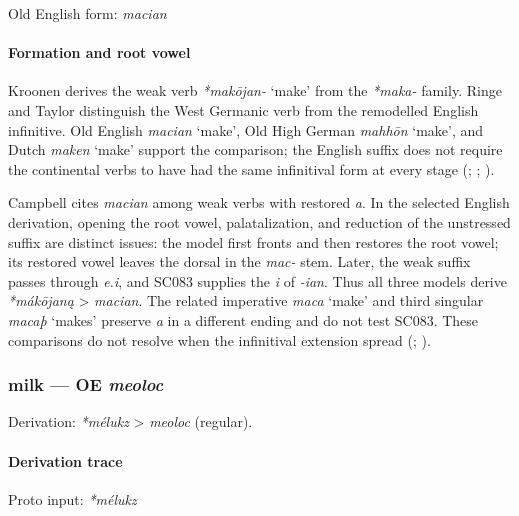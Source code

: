 \documentclass[
  british,
  a4paper,
]{article}
\providecommand{\Recon}[1]{\emph{*#1}}
\begin{document}
Old English form: \emph{macian}

\paragraph{Formation and root vowel}\label{formation-and-root-vowel}

Kroonen derives the weak verb \Recon{makōjan-} `make' from the
\emph{*maka-} family. Ringe and Taylor distinguish the West Germanic
verb from the remodelled English infinitive. Old English {\emph{macian}}
`make', Old High German \emph{mahhōn} `make', and Dutch \emph{maken}
`make' support the comparison; the English suffix does not require the
continental verbs to have had the same infinitival form at every stage
(;
;
).

Campbell cites \emph{macian} among weak verbs with restored \emph{a}. In
the selected English derivation, opening the root vowel, palatalization,
and reduction of the unstressed suffix are distinct issues: the model
first fronts and then restores the root vowel; its restored vowel leaves
the dorsal in the \emph{mac-} stem. Later, the weak suffix passes
through \emph{e.i}, and SC083 supplies the \emph{i} of \emph{-ian}. Thus
all three models derive \emph{*mákōjaną} \textgreater{} \emph{macian}.
The related imperative \emph{maca} `make' and third singular
\emph{macaþ} `makes' preserve \emph{a} in a different ending and do not
test SC083. These comparisons do not resolve when the infinitival
extension spread (; ).

\subsubsection{\texorpdfstring{milk --- OE
\emph{meoloc}}{milk --- OE meoloc}}\label{milk-oe-meoloc}

Derivation: \emph{*mélukz} \textgreater{} \emph{meoloc} (regular).

\paragraph{Derivation trace}\label{derivation-trace-60}

Proto input: \emph{*mélukz}

\begingroup
\setlength{\fboxsep}{6pt}
\end{document}
